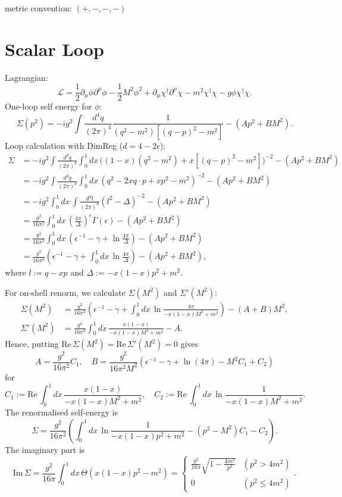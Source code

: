 \documentclass[11pt]{article}
\theoremstyle{definition}
\theoremstyle{remark}
\begin{document}
	metric convention: $(+,-,-,-)$
	\section{Scalar Loop}
	Lagrangian:
	\[\mathcal{L}=\frac{1}{2}\partial_{\mu}\phi\partial^{\mu}\phi-\frac{1}{2}M^{2}\phi^{2}+\partial_{\mu}\chi^{\dagger}\partial^{\mu}\chi-m^{2}\chi^{\dagger}\chi-g\phi\chi^{\dagger}\chi.\]
	One-loop self energy for $\phi$:
	\[\Sigma(p^{2})=-ig^{2}\int\frac{d^{4}q}{(2\pi)^{4}}\frac{1}{(q^{2}-m^{2})[(q-p)^{2}-m^{2}]}-(Ap^{2}+BM^{2}).\]
	Loop calculation with DimReg ($d=4-2\epsilon$):
	\begin{align*}
		\Sigma&=-ig^{2}\int\frac{d^{d}q}{(2\pi)^{d}}\int_{0}^{1}dx\,\Big((1-x)(q^{2}-m^{2})+x[(q-p)^{2}-m^{2}]\Big)^{-2}-(Ap^{2}+BM^{2})\\
		&=-ig^{2}\int\frac{d^{d}q}{(2\pi)^{d}}\int_{0}^{1}dx\,(q^{2}-2xq\cdot p+xp^{2}-m^{2})^{-2}-(Ap^{2}+BM^{2})\\
		&=-ig^{2}\int_{0}^{1}dx\,\int\frac{d^{d}l}{(2\pi)^{d}}(l^{2}-\Delta)^{-2}-(Ap^{2}+BM^{2})\\
		&=\frac{g^{2}}{16\pi^{2}}\int_{0}^{1}dx\,\left(\frac{4\pi}{\Delta}\right)^{\epsilon}\Gamma(\epsilon)-(Ap^{2}+BM^{2})\\
		&=\frac{g^{2}}{16\pi^{2}}\int_{0}^{1}dx\,\left(\epsilon^{-1}-\gamma+\ln\frac{4\pi}{\Delta}\right)-(Ap^{2}+BM^{2})\\
		&=\frac{g^{2}}{16\pi^{2}}\left(\epsilon^{-1}-\gamma+\int_{0}^{1}dx\,\ln\frac{4\pi}{\Delta}\right)-(Ap^{2}+BM^{2}),
	\end{align*}
	where $l:=q-xp$ and $\Delta:=-x(1-x)p^{2}+m^{2}$.
	
	For on-shell renorm, we calculate $\Sigma(M^{2})$ and $\Sigma'(M^{2})$:
	\begin{align*}
		\Sigma(M^{2})&=\frac{g^{2}}{16\pi^{2}}\left(\epsilon^{-1}-\gamma+\int_{0}^{1}dx\,\ln\frac{4\pi}{-x(1-x)M^{2}+m^{2}}\right)-(A+B)M^{2},\\
		\Sigma'(M^{2})&=\frac{g^{2}}{16\pi^{2}}\int_{0}^{1}dx\,\frac{x(1-x)}{-x(1-x)M^{2}+m^{2}}-A.
	\end{align*}
	Hence, putting $\mathrm{Re}\,\Sigma(M^{2})=\mathrm{Re}\,\Sigma'(M^{2})=0$ gives
	\[A=\frac{g^{2}}{16\pi^{2}}C_{1},\quad B=\frac{g^{2}}{16\pi^{2}M^{2}}\left(\epsilon^{-1}-\gamma+\ln(4\pi)-M^{2}C_{1}+C_{2}\right)\]
	for
	\[C_{1}:=\mathrm{Re}\,\int_{0}^{1}dx\,\frac{x(1-x)}{-x(1-x)M^{2}+m^{2}},\quad C_{2}:=\mathrm{Re}\,\int_{0}^{1}dx\,\ln\frac{1}{-x(1-x)M^{2}+m^{2}}.\]
	The renormalised self-energy is
	\[\Sigma=\frac{g^{2}}{16\pi^{2}}\left(\int_{0}^{1}dx\,\ln\frac{1}{-x(1-x)p^{2}+m^{2}}-(p^{2}-M^{2})C_{1}-C_{2}\right).\]
	The imaginary part is
	\[\mathrm{Im}\,\Sigma=\frac{g^{2}}{16\pi}\int_{0}^{1}dx\,\Theta(x(1-x)p^{2}-m^{2})=\begin{cases}
		\frac{g^{2}}{16\pi}\sqrt{1-\frac{4m^{2}}{p^{2}}}&(p^{2}>4m^{2})\\
		0&(p^{2}\leq4m^{2})
	\end{cases}.\]
	
\end{document}
